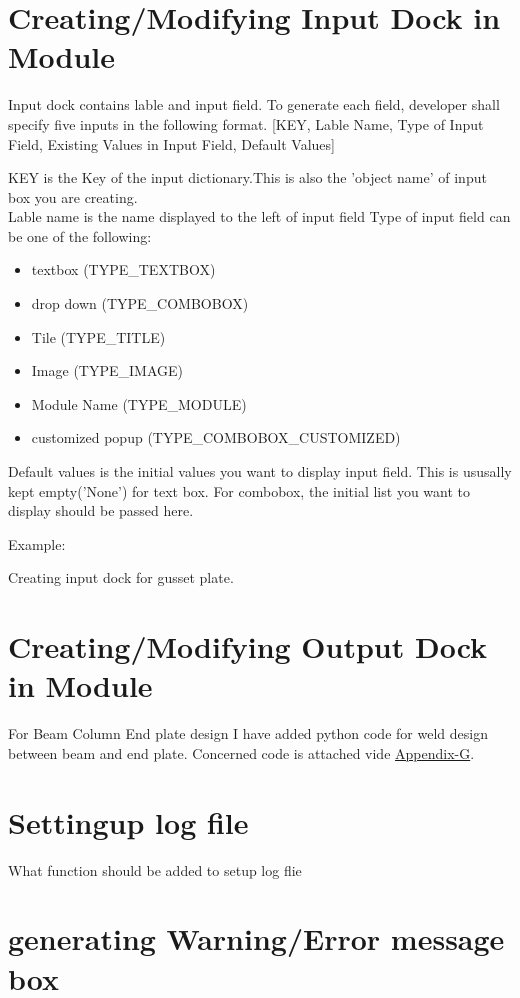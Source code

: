 \documentclass[11pt,a4paper]{report}
\begin{document}
\section{Creating/Modifying Input Dock in Module}
\noindent Input dock contains lable and input field. To generate each field, developer shall specify five inputs in the following format.
[KEY, Lable Name, Type of Input Field, Existing Values in Input Field, Default Values]

KEY is the Key of the input dictionary.This is also the 'object name' of input box you are creating.\\ 
Lable name is the name displayed to the left of input field
Type of input field can be one of the following:
\begin{itemize}
\item textbox (TYPE\_TEXTBOX)
\item drop down (TYPE\_COMBOBOX)
\item Tile (TYPE\_TITLE)
\item Image (TYPE\_IMAGE)
\item Module Name (TYPE\_MODULE)
\item customized popup (TYPE\_COMBOBOX\_CUSTOMIZED)
\end{itemize} 

Default values is the initial values you want to display input field. This is ususally kept empty('None') for text box. For combobox, the initial list you want to display should be passed here.

Example:

Creating input dock for gusset plate.




\section{Creating/Modifying Output Dock in Module}
\noindent For Beam Column End plate design I have added python code for weld design between beam and end plate. Concerned code is attached vide \hyperlink {page.102}{Appendix-G}.

\section{Settingup log file}
\noindent What function should be added to setup log flie

\section{generating Warning/Error message box}
\end{document}

